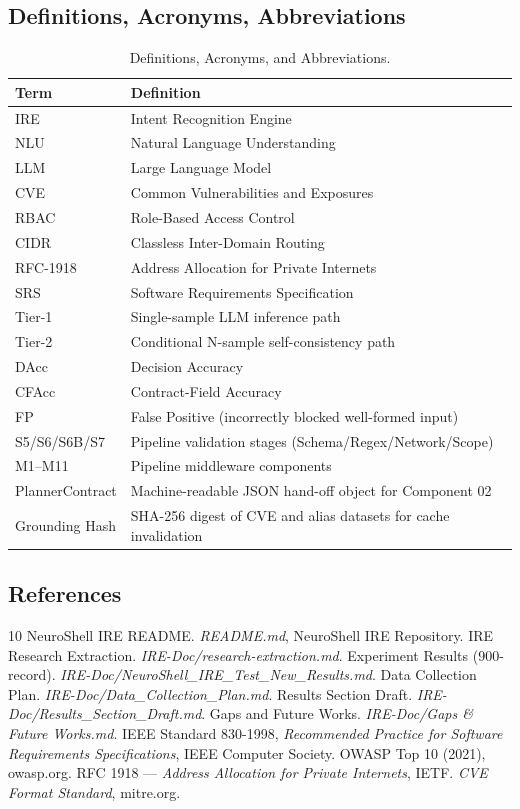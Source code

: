 \documentclass[10pt,journal,onecolumn]{IEEEtran}
\begin{document}
\subsection{Definitions, Acronyms, Abbreviations}
\begin{table}[h]
\caption{Definitions, Acronyms, and Abbreviations.}
\label{tab:definitions}
\begin{tabularx}{\columnwidth}{>{\ttfamily}l X}
\toprule
\textbf{Term} & \textbf{Definition}\\
\midrule
IRE & Intent Recognition Engine\\
NLU & Natural Language Understanding\\
LLM & Large Language Model\\
CVE & Common Vulnerabilities and Exposures\\
RBAC & Role-Based Access Control\\
CIDR & Classless Inter-Domain Routing\\
RFC-1918 & Address Allocation for Private Internets\\
SRS & Software Requirements Specification\\
Tier-1 & Single-sample LLM inference path\\
Tier-2 & Conditional N-sample self-consistency path\\
DAcc & Decision Accuracy\\
CFAcc & Contract-Field Accuracy\\
FP & False Positive (incorrectly blocked well-formed input)\\
S5/S6/S6B/S7 & Pipeline validation stages (Schema/Regex/Network/Scope)\\
M1--M11 & Pipeline middleware components\\
PlannerContract & Machine-readable JSON hand-off object for Component 02\\
Grounding Hash & SHA-256 digest of CVE and alias datasets for cache invalidation\\
\bottomrule
\end{tabularx}
\end{table}

\subsection{References}
\begin{thebibliography}{10}
 NeuroShell IRE README. \emph{README.md}, NeuroShell IRE Repository.
 IRE Research Extraction. \emph{IRE-Doc/research-extraction.md}.
 Experiment Results (900-record). \emph{IRE-Doc/NeuroShell\_IRE\_Test\_New\_Results.md}.
 Data Collection Plan. \emph{IRE-Doc/Data\_Collection\_Plan.md}.
 Results Section Draft. \emph{IRE-Doc/Results\_Section\_Draft.md}.
 Gaps and Future Works. \emph{IRE-Doc/Gaps \& Future Works.md}.
 IEEE Standard 830-1998, \emph{Recommended Practice for Software Requirements Specifications}, IEEE Computer Society.
 OWASP Top 10 (2021), owasp.org.
 RFC 1918 --- \emph{Address Allocation for Private Internets}, IETF.
 \emph{CVE Format Standard}, mitre.org.
\end{thebibliography}
\end{document}
